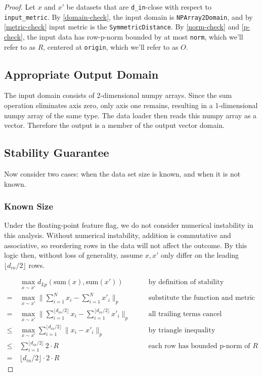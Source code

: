 \documentclass{article}
\begin{document}
\begin{proof} 

Let $x$ and $x'$ be datasets that are \texttt{d\_in}-close with respect to \texttt{input\_metric}.
By \ref{domain-check}, the input domain is \texttt{NPArray2Domain},
and by \ref{metric-check} input metric is the \texttt{SymmetricDistance}. 
By \ref{norm-check} and \ref{p-check}, the input data has row-p-norm bounded by at most \texttt{norm}, which we'll refer to as $R$,
centered at \texttt{origin}, which we'll refer to as $O$.

\subsection{Appropriate Output Domain}

The input domain consists of 2-dimensional numpy arrays.
Since the sum operation eliminates axis zero, only axis one remains, 
resulting in a 1-dimensional numpy array of the same type.
The data loader then reads this numpy array as a vector.
Therefore the output is a member of the output vector domain.

\subsection{Stability Guarantee}

Now consider two cases: when the data set size is known, and when it is not known.

\subsubsection{Known Size}
    \label{known-size}
    Under the floating-point feature flag, we do not consider numerical instability in this analysis.
    Without numerical instability, addition is commutative and associative, 
    so reordering rows in the data will not affect the outcome.
    By this logic then, without loss of generality,
    assume $x, x'$ only differ on the leading $\lfloor d_{in} / 2 \rfloor$ rows.

    \begin{align}
        & \ \max_{x \sim x'} d_{Lp}(\mathrm{sum}(x), \mathrm{sum}(x')) && \quad \text{by definition of stability}\\
        =&\ \max_{x \sim x'} \lVert\sum_{i = 1}^N x_i - \sum_{i = 1}^{N} x'_i \rVert_p && \quad \text{substitute the function and metric} \\
        =&\ \max_{x \sim x'} \lVert\sum_{i = 1}^{\lfloor d_{in} / 2 \rfloor} x_{i} - \sum_{i = 1}^{\lfloor d_{in} / 2 \rfloor} x'_{i}\rVert_p && \quad\text{all trailing terms cancel} \\
        \le&\ \max_{x \sim x'} \sum_{i = 1}^{\lfloor d_{in} / 2 \rfloor} \lVert x_i - x'_{i} \rVert_p && \quad \text{by triangle inequality} \\
        \le&\ \sum_{i = 1}^{\lfloor d_{in} / 2 \rfloor} 2 \cdot R && \quad\text{each row has bounded p-norm of } R \\
        =&\ \lfloor d_{in} / 2 \rfloor \cdot 2 \cdot R
    \end{align}


\end{proof}
\end{document}
